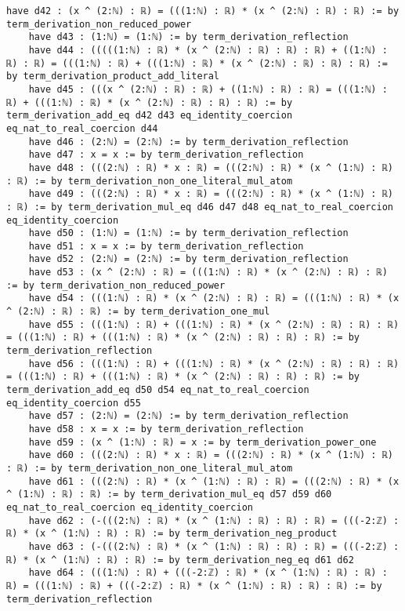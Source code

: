 \documentclass{article}
\begin{document}
\begin{tcolorbox}[colback=white!10, width=\linewidth]
\begin{lstlisting}[language=Lean4]
    have d42 : (x ^ (2:ℕ) : ℝ) = (((1:ℕ) : ℝ) * (x ^ (2:ℕ) : ℝ) : ℝ) := by term_derivation_non_reduced_power
    have d43 : (1:ℕ) = (1:ℕ) := by term_derivation_reflection
    have d44 : (((((1:ℕ) : ℝ) * (x ^ (2:ℕ) : ℝ) : ℝ) : ℝ) + ((1:ℕ) : ℝ) : ℝ) = (((1:ℕ) : ℝ) + (((1:ℕ) : ℝ) * (x ^ (2:ℕ) : ℝ) : ℝ) : ℝ) := by term_derivation_product_add_literal
    have d45 : (((x ^ (2:ℕ) : ℝ) : ℝ) + ((1:ℕ) : ℝ) : ℝ) = (((1:ℕ) : ℝ) + (((1:ℕ) : ℝ) * (x ^ (2:ℕ) : ℝ) : ℝ) : ℝ) := by term_derivation_add_eq d42 d43 eq_identity_coercion eq_nat_to_real_coercion d44
    have d46 : (2:ℕ) = (2:ℕ) := by term_derivation_reflection
    have d47 : x = x := by term_derivation_reflection
    have d48 : (((2:ℕ) : ℝ) * x : ℝ) = (((2:ℕ) : ℝ) * (x ^ (1:ℕ) : ℝ) : ℝ) := by term_derivation_non_one_literal_mul_atom
    have d49 : (((2:ℕ) : ℝ) * x : ℝ) = (((2:ℕ) : ℝ) * (x ^ (1:ℕ) : ℝ) : ℝ) := by term_derivation_mul_eq d46 d47 d48 eq_nat_to_real_coercion eq_identity_coercion
    have d50 : (1:ℕ) = (1:ℕ) := by term_derivation_reflection
    have d51 : x = x := by term_derivation_reflection
    have d52 : (2:ℕ) = (2:ℕ) := by term_derivation_reflection
    have d53 : (x ^ (2:ℕ) : ℝ) = (((1:ℕ) : ℝ) * (x ^ (2:ℕ) : ℝ) : ℝ) := by term_derivation_non_reduced_power
    have d54 : (((1:ℕ) : ℝ) * (x ^ (2:ℕ) : ℝ) : ℝ) = (((1:ℕ) : ℝ) * (x ^ (2:ℕ) : ℝ) : ℝ) := by term_derivation_one_mul
    have d55 : (((1:ℕ) : ℝ) + (((1:ℕ) : ℝ) * (x ^ (2:ℕ) : ℝ) : ℝ) : ℝ) = (((1:ℕ) : ℝ) + (((1:ℕ) : ℝ) * (x ^ (2:ℕ) : ℝ) : ℝ) : ℝ) := by term_derivation_reflection
    have d56 : (((1:ℕ) : ℝ) + (((1:ℕ) : ℝ) * (x ^ (2:ℕ) : ℝ) : ℝ) : ℝ) = (((1:ℕ) : ℝ) + (((1:ℕ) : ℝ) * (x ^ (2:ℕ) : ℝ) : ℝ) : ℝ) := by term_derivation_add_eq d50 d54 eq_nat_to_real_coercion eq_identity_coercion d55
    have d57 : (2:ℕ) = (2:ℕ) := by term_derivation_reflection
    have d58 : x = x := by term_derivation_reflection
    have d59 : (x ^ (1:ℕ) : ℝ) = x := by term_derivation_power_one
    have d60 : (((2:ℕ) : ℝ) * x : ℝ) = (((2:ℕ) : ℝ) * (x ^ (1:ℕ) : ℝ) : ℝ) := by term_derivation_non_one_literal_mul_atom
    have d61 : (((2:ℕ) : ℝ) * (x ^ (1:ℕ) : ℝ) : ℝ) = (((2:ℕ) : ℝ) * (x ^ (1:ℕ) : ℝ) : ℝ) := by term_derivation_mul_eq d57 d59 d60 eq_nat_to_real_coercion eq_identity_coercion
    have d62 : (-(((2:ℕ) : ℝ) * (x ^ (1:ℕ) : ℝ) : ℝ) : ℝ) = (((-2:ℤ) : ℝ) * (x ^ (1:ℕ) : ℝ) : ℝ) := by term_derivation_neg_product
    have d63 : (-(((2:ℕ) : ℝ) * (x ^ (1:ℕ) : ℝ) : ℝ) : ℝ) = (((-2:ℤ) : ℝ) * (x ^ (1:ℕ) : ℝ) : ℝ) := by term_derivation_neg_eq d61 d62
    have d64 : (((1:ℕ) : ℝ) + (((-2:ℤ) : ℝ) * (x ^ (1:ℕ) : ℝ) : ℝ) : ℝ) = (((1:ℕ) : ℝ) + (((-2:ℤ) : ℝ) * (x ^ (1:ℕ) : ℝ) : ℝ) : ℝ) := by term_derivation_reflection

\end{lstlisting}
\end{tcolorbox}
\end{document}
